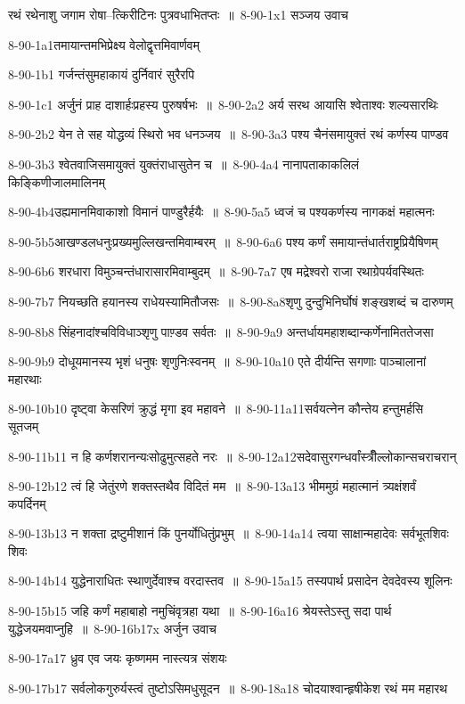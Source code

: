 रथं रथेनाशु जगाम रोषा--त्किरीटिनः पुत्रवधाभितप्तः ॥ 8-90-1x1 सञ्जय उवाच

8-90-1a1तमायान्तमभिप्रेक्ष्य वेलोद्वृत्तमिवार्णवम्

8-90-1b1 गर्जन्तंसुमहाकायं दुर्निवारं सुरैरपि

8-90-1c1 अर्जुनं प्राह दाशार्हःप्रहस्य पुरुषर्षभः ॥ 8-90-2a2 अर्य सरथ आयासि श्वेताश्वः शल्यसारथिः

8-90-2b2 येन ते सह योद्धव्यं स्थिरो भव धनञ्जय ॥ 8-90-3a3 पश्य चैनंसमायुक्तं रथं कर्णस्य पाण्डव

8-90-3b3 श्वेतवाजिसमायुक्तं युक्तंराधासुतेन च ॥ 8-90-4a4 नानापताकाकलिलं किङ्किणीजालमालिनम्

8-90-4b4उह्यमानमिवाकाशो विमानं पाण्डुरैर्हयैः ॥ 8-90-5a5 ध्वजं च पश्यकर्णस्य नागकक्षं महात्मनः

8-90-5b5आखण्डलधनुःप्रख्यमुल्लिखन्तमिवाम्बरम् ॥ 8-90-6a6 पश्य कर्णं समायान्तंधार्तराष्ट्रप्रियैषिणम्

8-90-6b6 शरधारा विमुञ्चन्तंधारासारमिवाम्बुदम् ॥ 8-90-7a7 एष मद्रेश्वरो राजा रथाग्रेपर्यवस्थितः

8-90-7b7 नियच्छति हयानस्य राधेयस्यामितौजसः ॥ 8-90-8a8शृणु दुन्दुभिनिर्घोषं शङ्खशब्दं च दारुणम्

8-90-8b8 सिंहनादांश्चविविधाञ्शृणु पाण़्डव सर्वतः ॥ 8-90-9a9 अन्तर्धायमहाशब्दान्कर्णेनामिततेजसा

8-90-9b9 दोधूयमानस्य भृशं धनुषः शृणुनिःस्वनम् ॥ 8-90-10a10 एते दीर्यन्ति सगणाः पाञ्चालानां महारथाः

8-90-10b10 दृष्ट्वा केसरिणं क्रुद्धं मृगा इव महावने ॥ 8-90-11a11सर्वयत्नेन कौन्तेय हन्तुमर्हसि सूतजम्

8-90-11b11 न हि कर्णशरानन्यःसोढुमुत्सहते नरः ॥ 8-90-12a12सदेवासुरगन्धर्वांस्त्रीँल्लोकान्सचराचरान्

8-90-12b12 त्वं हि जेतुंरणे शक्तस्तथैव विदितं मम ॥ 8-90-13a13 भीममुग्रं महात्मानं त्र्यक्षंशर्वं कपर्दिनम्

8-90-13b13 न शक्ता द्रष्टुमीशानं किं पुनर्योधितुंप्रभुम् ॥ 8-90-14a14 त्वया साक्षान्महादेवः सर्वभूतशिवः शिवः

8-90-14b14 युद्धेनाराधितः स्थाणुर्देवाश्च वरदास्तव ॥ 8-90-15a15 तस्यपार्थ प्रसादेन देवदेवस्य शूलिनः

8-90-15b15 जहि कर्णं महाबाहो नमुचिंवृत्रहा यथा ॥ 8-90-16a16 श्रेयस्तेऽस्तु सदा पार्थ युद्धेजयमवाप्नुहि ॥ 8-90-16b17x अर्जुन उवाच

8-90-17a17 ध्रुव एव जयः कृष्णमम नास्त्यत्र संशयः

8-90-17b17 सर्वलोकगुरुर्यस्त्वं तुष्टोऽसिमधुसूदन ॥ 8-90-18a18 चोदयाश्वान्हृषीकेश रथं मम महारथ


